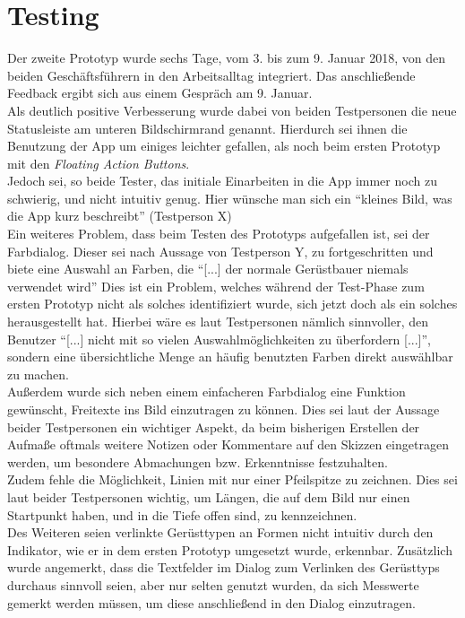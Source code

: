 \section{Testing}\label{sec:test2}
Der zweite Prototyp wurde sechs Tage, vom 3. bis zum 9. Januar 2018, von den beiden Geschäftsführern in den Arbeitsalltag integriert.
Das anschließende Feedback ergibt sich aus einem Gespräch am 9. Januar. \\

Als deutlich positive Verbesserung wurde dabei von beiden Testpersonen die neue Statusleiste am unteren Bildschirmrand genannt.
Hierdurch sei ihnen die Benutzung der App um einiges leichter gefallen, als noch beim ersten Prototyp mit den \emph{Floating Action Buttons}. \\

Jedoch sei, so beide Tester, das initiale Einarbeiten in die App immer noch zu schwierig, und nicht intuitiv genug.
Hier wünsche man sich ein ``kleines Bild, was die App kurz beschreibt'' (Testperson X) \\

Ein weiteres Problem, dass beim Testen des Prototyps aufgefallen ist, sei der Farbdialog.
Dieser sei nach Aussage von Testperson Y, zu fortgeschritten und biete eine Auswahl an Farben, die ``[...] der normale Gerüstbauer niemals verwendet wird'' 
Dies ist ein Problem, welches während der Test-Phase zum ersten Prototyp nicht als solches identifiziert wurde, sich jetzt doch als ein solches herausgestellt hat.
Hierbei wäre es laut Testpersonen nämlich sinnvoller, den Benutzer ``[...] nicht mit so vielen Auswahlmöglichkeiten zu überfordern [...]'', sondern eine übersichtliche Menge an häufig benutzten Farben direkt auswählbar zu machen. \\

Außerdem wurde sich neben einem einfacheren Farbdialog eine Funktion gewünscht, Freitexte ins Bild einzutragen zu können. 
Dies sei laut der Aussage beider Testpersonen ein wichtiger Aspekt, da beim bisherigen Erstellen der Aufmaße oftmals weitere Notizen oder Kommentare auf den Skizzen eingetragen werden, um besondere Abmachungen bzw. Erkenntnisse festzuhalten. \\

Zudem fehle die Möglichkeit, Linien mit nur einer Pfeilspitze zu zeichnen.
Dies sei laut beider Testpersonen wichtig, um Längen, die auf dem Bild nur einen Startpunkt haben, und in die Tiefe offen sind, zu kennzeichnen. \\

Des Weiteren seien verlinkte Gerüsttypen an Formen nicht intuitiv durch den Indikator, wie er in dem ersten Prototyp umgesetzt wurde, erkennbar.
Zusätzlich wurde angemerkt, dass die Textfelder im Dialog zum Verlinken des Gerüsttyps durchaus sinnvoll seien, aber nur selten genutzt wurden, da sich Messwerte gemerkt werden müssen, um diese anschließend in den Dialog einzutragen. \\
